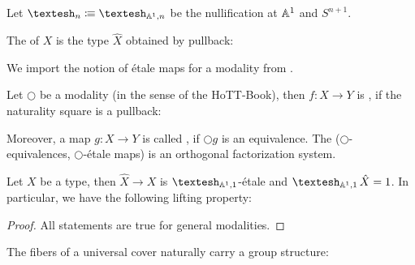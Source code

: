 \begin{definition}
  Let $\shape_n\colonequiv\shape_{\A^1,n}$ be the nullification at $\mathbb{A}^1$ and $S^{n+1}$.
\end{definition}

\begin{definition}
  The  of $X$ is the type $\hat{X}$ obtained by pullback:
  \begin{center}
  \end{center}
\end{definition}

We import the notion of étale maps for a modality from \cite{cherubini_rijke_2021}.

\begin{definition}
  Let $\bigcirc$ be a modality (in the sense of the HoTT-Book),
  then $f:X\to Y$ is , if the naturality square is a pullback:
  \begin{center}
  \end{center}
  Moreover, a map $g:X\to Y$ is called ,
  if $\bigcirc g$ is an equivalence.
  The ($\bigcirc$-equivalences, $\bigcirc$-étale maps) is an orthogonal factorization system. 
\end{definition}

\begin{proposition}
  Let $X$ be a type, then $\hat{X}\to X$ is $\shape_{\A^1,1}$-étale and $\shape_{\A^1,1}\hat{X}=1$.
  In particular, we have the following lifting property:
  \begin{center}
  \end{center}
\end{proposition}

\begin{proof}
  All statements are true for general modalities.
\end{proof}

\begin{example}
  The fibers of a universal cover naturally carry a group structure:
  \begin{center}
  \end{center}
\end{example}